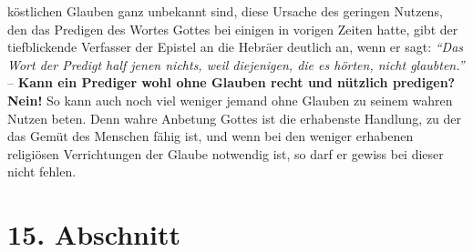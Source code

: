 köstlichen Glauben ganz unbekannt sind, diese Ursache des geringen Nutzens, den
das Predigen des Wortes Gottes bei einigen in vorigen Zeiten
hatte, gibt der
tiefblickende Verfasser der Epistel an die Hebräer
deutlich an, wenn er sagt:
\textit{"`Das Wort der Predigt half jenen nichts, weil
diejenigen, die es hörten, nicht glaubten."'}
\label{ref:06_14_predigt}
-- \textbf{Kann
ein
Prediger wohl ohne Glauben recht und nützlich predigen? Nein!} So kann auch noch
viel weniger jemand ohne Glauben zu seinem wahren Nutzen beten. Denn wahre
Anbetung Gottes ist die erhabenste Handlung, zu der das Gemüt des Menschen fähig
ist, und wenn bei den weniger erhabenen religiösen Verrichtungen der Glaube
notwendig ist, so darf er gewiss bei dieser nicht fehlen.

\section{15. Abschnitt} \label{kap6_ab15}


